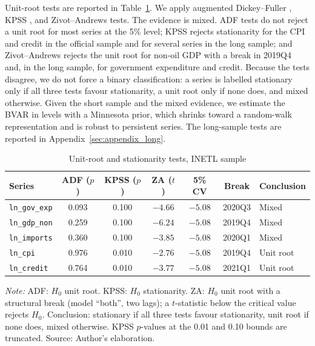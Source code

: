 \documentclass[11pt,a4paper]{article}
\begin{document}
Unit-root tests are reported in Table~\ref{tab:stationarity}. We apply augmented Dickey--Fuller \parencite{dickeyfuller1979}, KPSS \parencite{kpss1992}, and Zivot--Andrews \parencite{zivot1992} tests. The evidence is mixed. ADF tests do not reject a unit root for most series at the 5\% level; KPSS rejects stationarity for the CPI and credit in the official sample and for several series in the long sample; and Zivot--Andrews rejects the unit root for non-oil GDP with a break in 2019Q4 and, in the long sample, for government expenditure and credit. Because the tests disagree, we do not force a binary classification: a series is labelled stationary only if all three tests favour stationarity, a unit root only if none does, and mixed otherwise. Given the short sample and the mixed evidence, we estimate the BVAR in levels with a Minnesota prior, which shrinks toward a random-walk representation and is robust to persistent series. The long-sample tests are reported in Appendix~\ref{sec:appendix_long}.

\begin{table}[htbp]
\centering
\small
\caption{Unit-root and stationarity tests, INETL sample}
\label{tab:stationarity}
\begin{tabular}{@{}lcccccl@{}}
\toprule
Series & ADF ($p$) & KPSS ($p$) & ZA ($t$) & 5\% CV & Break & Conclusion \\
\midrule
\texttt{ln\_gov\_exp} & 0.093 & 0.100 & $-4.66$ & $-5.08$ & 2020Q3 & Mixed \\
\texttt{ln\_gdp\_non} & 0.259 & 0.100 & $-6.24$ & $-5.08$ & 2019Q4 & Mixed \\
\texttt{ln\_imports} & 0.360 & 0.100 & $-3.85$ & $-5.08$ & 2020Q1 & Mixed \\
\texttt{ln\_cpi} & 0.976 & 0.010 & $-2.76$ & $-5.08$ & 2019Q4 & Unit root \\
\texttt{ln\_credit} & 0.764 & 0.010 & $-3.77$ & $-5.08$ & 2021Q1 & Unit root \\
\bottomrule
\end{tabular}
\par\vspace{0.3em}
\begin{minipage}{0.95\textwidth}
\footnotesize\textit{Note:} ADF: $H_0$ unit root. KPSS: $H_0$ stationarity. ZA: $H_0$ unit root with a structural break (model ``both'', two lags); a $t$-statistic below the critical value rejects $H_0$. Conclusion: stationary if all three tests favour stationarity, unit root if none does, mixed otherwise. KPSS $p$-values at the 0.01 and 0.10 bounds are truncated. Source: Author's elaboration.
\end{minipage}
\end{table}
\end{document}
